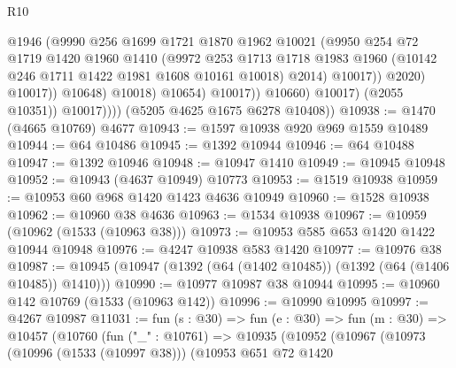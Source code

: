 \begin{lexlean}{R10}
\begin{coremodule}
                                    @1946
                                    (@9990
                                      @256
                                      @1699
                                      @1721
                                      @1870
                                      @1962
                                      @10021
                                      (@9950
                                        @254
                                        @72
                                        @1719
                                        @1420
                                        @1960
                                        @1410
                                        (@9972
                                          @253
                                          @1713
                                          @1718
                                          @1983
                                          @1960
                                          (@10142 @246 @1711 @1422 @1981 @1608 @10161 @10018)
                                          @2014)
                                        @10017))
                                    @2020)
                                  @10017))
                              @10648)
                            @10018)
                          @10654)
                        @10017))
                    @10660)
                  @10017)
                (@2055 @10351))
              @10017))))
      (@5205 @4625 @1675 @6278 @10408))
@10938 := @1470 (@4665 @10769) @4677
@10943 := @1597 @10938 @920 @969 @1559 @10489
@10944 := @64 @10486
@10945 := @1392 @10944
@10946 := @64 @10488
@10947 := @1392 @10946
@10948 := @10947 @1410
@10949 := @10945 @10948
@10952 := @10943 (@4637 @10949) @10773
@10953 := @1519 @10938
@10959 := @10953 @60 @968 @1420 @1423 @4636 @10949
@10960 := @1528 @10938
@10962 := @10960 @38 @4636
@10963 := @1534 @10938
@10967 := @10959 (@10962 (@1533 (@10963 @38)))
@10973 := @10953 @585 @653 @1420 @1422 @10944 @10948
@10976 := @4247 @10938 @583 @1420
@10977 := @10976 @38
@10987 := @10945 (@10947 (@1392 (@64 (@1402 @10485)) (@1392 (@64 (@1406 @10485)) @1410)))
@10990 := @10977 @10987 @38 @10944
@10995 := @10960 @142 @10769 (@1533 (@10963 @142))
@10996 := @10990 @10995
@10997 := @4267 @10987
@11031 := fun (s : @30) =>
  fun (e : @30) =>
  fun (m : @30) =>
  @10457
    (@10760
      (fun ("_" : @10761) =>
      @10935
        (@10952
          (@10967
            (@10973
              (@10996 (@1533 (@10997 @38)))
              (@10953
                @651
                @72
                @1420

\end{coremodule}
\end{lexlean}
